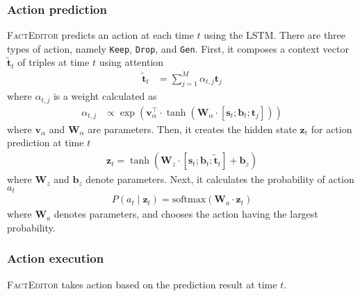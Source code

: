 \documentclass[11pt,a4paper]{article}
\begin{document}
\subsubsection*{Action prediction}

\textsc{FactEditor} predicts an action at each time $t$ using the LSTM. There are three types of action, namely \texttt{Keep}, \texttt{Drop}, and \texttt{Gen}. First, it composes a context vector $\tilde{\boldsymbol{t}}_t$ of triples at time $t$ using attention
\begin{align*}
    \tilde{\boldsymbol{t}}_t &= \sum_{j=1}^M \alpha_{t, j} \boldsymbol{t}_j
\end{align*}
where $\alpha_{t, j}$ is a weight calculated as
\begin{align*}
    \alpha_{t, j} & \propto \exp \left(\boldsymbol{v}_{\alpha}^\top \cdot \tanh{(\boldsymbol{W}_{\alpha} \cdot [\boldsymbol{s}_t;\boldsymbol{b}_t;\boldsymbol{t}_j]
    )}\right)
\end{align*}
where $\boldsymbol{v}_{\alpha}$ and $\boldsymbol{W}_{\alpha}$ are parameters. Then, it creates the hidden state $\boldsymbol{z}_t$ for action prediction at time $t$
\begin{align*}
    \boldsymbol{z}_t = \tanh \left(\boldsymbol{W}_{z} \cdot [\boldsymbol{s}_t; \boldsymbol{b}_t; \tilde{\boldsymbol{t}}_t] + \boldsymbol{b}_{z} \right)
\end{align*}
where $\boldsymbol{W}_{z}$ and $\boldsymbol{b}_{z}$ denote parameters. Next, it calculates the probability of action $a_t$
\begin{align*}
    P({a}_t \mid \boldsymbol{z}_t) = \text{softmax}(\boldsymbol{W}_{a} \cdot \boldsymbol{z}_t)
\end{align*}
where $\boldsymbol{W}_{a}$ denotes parameters, and chooses the action having the largest probability.

\subsubsection*{Action execution}

\textsc{FactEditor} takes action based on the prediction result at time $t$.
\end{document}
